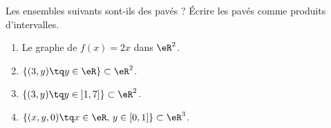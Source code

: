 \begin{exercice}\label{exoGeomAnal-0007}

	Les ensembles suivants sont-ils des pavés ? Écrire les pavés comme produits d'intervalles.
	\begin{enumerate}
		\item
			Le graphe de $f(x)=2x$ dans $\eR^2$.
		\item
			$\{ (3,y)\tq y\in\eR \}\subset\eR^2$.
		\item
			$\{ (3,y)\tq y\in\mathopen] 1 , 7 \mathclose] \}\subset\eR^2$.
		\item
			$\{ (x,y,0)\tq x\in\eR,\,y\in\mathopen[ 0 , 1 \mathclose] \}\subset\eR^3$.
	\end{enumerate}
	
\end{exercice}

